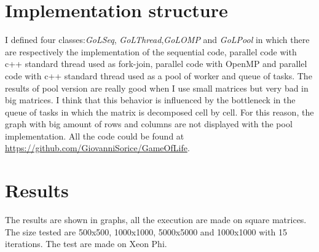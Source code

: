 \documentclass[a4paper,10pt]{article}
\begin{document}
	\section{Implementation structure}
	I defined four classes:\textit{GoLSeq}, \textit{GoLThread},\textit{GoLOMP} and \textit{GoLPool} in which there are respectively the implementation of the sequential code, parallel code with c++ standard thread used as fork-join, parallel code with OpenMP and parallel code with c++ standard thread used as a pool of worker and queue of tasks.
	The results of pool version are  really good when I use small matrices but very bad in big matrices. I think that this behavior is influenced by the bottleneck in the queue of tasks in which the matrix is decomposed cell by cell.   
	For this reason, the graph with big amount of rows and columns are not displayed with the pool implementation.
	All the code could be found at \url{https://github.com/GiovanniSorice/GameOfLife}.

	\section{Results}
	The results are shown in graphs, all the execution are made on square matrices. The size tested are 500x500, 1000x1000, 5000x5000 and 1000x1000 with 15 iterations.
	The test are made on Xeon Phi. 
	
\end{document}
